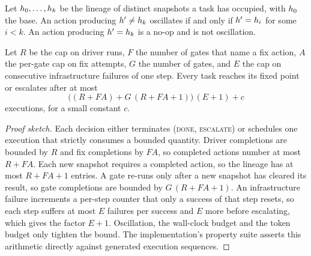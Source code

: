 \begin{definition}[Oscillation]
  Let \(h_0, \ldots, h_k\) be the lineage of distinct
  snapshots a task has occupied, with \(h_0\) the base. An action
  producing \(h' \neq h_k\) oscillates if and only if
  \(h' = h_i\) for some \(i < k\). An action producing
  \(h' = h_k\) is a no-op and is not oscillation.
\end{definition}

\begin{proposition}
  Let \(R\) be the cap on driver runs, \(F\) the number of gates that name a
  fix action, \(A\) the per-gate cap on fix attempts, \(G\) the number of
  gates, and \(E\) the cap on consecutive infrastructure failures of one step.
  Every task reaches its fixed point or escalates after at most
  \[
    \bigl( (R + FA) + G\,(R + FA + 1) \bigr)\,(E + 1) + c
  \]
  executions, for a small constant \(c\).
\end{proposition}

\begin{proof}[Proof sketch]
  Each decision either terminates (\textsc{done}, \textsc{escalate}) or
  schedules one execution that strictly consumes a bounded quantity. Driver
  completions are bounded by \(R\) and fix completions by \(FA\), so completed
  actions number at most \(R + FA\). Each new snapshot requires a completed
  action, so the lineage has at most \(R + FA + 1\) entries. A gate re-runs
  only after a new snapshot has cleared its result, so gate completions are
  bounded by \(G\,(R + FA + 1)\). An infrastructure failure increments a
  per-step counter that only a success of that step resets, so each step
  suffers at most \(E\) failures per success and \(E\) more before escalating,
  which gives the factor \(E + 1\). Oscillation, the wall-clock budget and the
  token budget only tighten the bound. The implementation's property suite
  asserts this arithmetic directly against generated execution sequences.
\end{proof}

